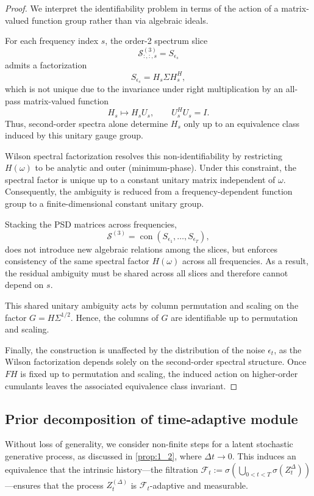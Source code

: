 \documentclass[10pt]{article}
\numberwithin{figure}{section}
\begin{document}
\begin{proof}
We interpret the identifiability problem in terms of the action of a matrix-valued function group rather than via algebraic ideals.

For each frequency index $s$, the order-2 spectrum slice
\[
\mathcal{S}^{(3)}_{:,:,s} = S_{\epsilon_s}
\]
admits a factorization
\[
S_{\epsilon_s} = H_s \Sigma H_s^H,
\]
which is not unique due to the invariance under right multiplication by an all-pass matrix-valued function
\[
H_s \mapsto H_s U_s,
\qquad U_s^H U_s = I.
\]
Thus, second-order spectra alone determine $H_s$ only up to an equivalence class induced by this unitary gauge group.

Wilson spectral factorization resolves this non-identifiability by restricting $H(\omega)$ to be analytic and outer (minimum-phase). Under this constraint, the spectral factor is unique up to a constant unitary matrix independent of $\omega$. Consequently, the ambiguity is reduced from a frequency-dependent function group to a finite-dimensional constant unitary group.

Stacking the PSD matrices across frequencies,
\[
\mathcal{S}^{(3)} = \operatorname{con}(S_{\epsilon_1}, \dots, S_{\epsilon_T}),
\]
does not introduce new algebraic relations among the slices, but enforces consistency of the same spectral factor $H(\omega)$ across all frequencies. As a result, the residual ambiguity must be shared across all slices and therefore cannot depend on $s$.

This shared unitary ambiguity acts by column permutation and scaling on the factor $G = H \Sigma^{1/2}$. Hence, the columns of $G$ are identifiable up to permutation and scaling.

Finally, the construction is unaffected by the distribution of the noise $\epsilon_t$, as the Wilson factorization depends solely on the second-order spectral structure. Once $FH$ is fixed up to permutation and scaling, the induced action on higher-order cumulants leaves the associated equivalence class invariant.
\end{proof}


\subsection{Prior decomposition of time-adaptive module}\label{exp_MUTATE}

Without loss of generality, we consider non-finite steps for a latent stochastic generative process, as discussed in \autoref{prop:1_2}, where $\Delta t \rightarrow 0$. This induces an equivalence that the intrinsic history—the filtration $\mathcal{F}_t := \sigma\left( \bigcup_{0 < t < T} \sigma(Z_t^{\Delta}) \right)$—ensures that the process $Z_t^{(\Delta)}$ is $\mathcal{F}_t$-adaptive and measurable.
\end{document}
